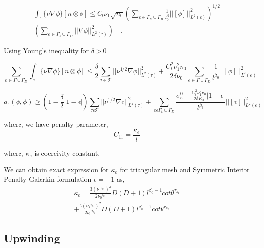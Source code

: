 \documentclass[a4paper,openany]{book}
\begin{document}
\begin{equation}
\begin{split}
\int_e \lbrace \nu \nabla \phi \rbrace[n \otimes \phi] \leq C_t \nu_1 \sqrt{n_0} \left( \sum_{e \in \Gamma_h \cup \Gamma_D} \frac{1}{l^\beta_0} ||[\phi]||^2_{L^2(e)} \right)^{1/2} \\ \left( \sum_{e \in \Gamma_h \cup \Gamma_D} ||\nabla \phi||^2_{L^2(\tau)} \right) \quad \textrm{.}
\end{split}
\end{equation}

Using Young's inequality for $\delta > 0$

\begin{equation}
\sum_{e \in \Gamma \cup \Gamma_D} \int_e \lbrace \nu \nabla \phi \rbrace [n \otimes \phi] \leq \frac{\delta}{2} \sum_{\tau \in \mathcal{T}} ||\nu^{1/2} \nabla \phi ||^2_{L^2(\tau)} +  \frac{C_t^2 \nu_1^2 n_0}{2 \delta \nu_0}  \sum_{e \in \Gamma \cup \Gamma_D} \frac{1}{l^{\beta_0}} ||[\phi]||^2_{L^2(e)}
\end{equation}


\begin{equation}
a_\epsilon (\phi , \phi) \geq \left( 1-\frac{\delta}{2} |1-\epsilon| \right) \sum_{\tau \epsilon \mathcal{T}} ||\nu^{1/2} \nabla v ||^2_{L^2(\tau)} + \sum_{e \epsilon \Gamma_h \cup \Gamma_D} \frac{\sigma_e^0 - \frac{C_t^2 \nu_1^2 n_0}{2 \delta K_0}|1-\epsilon|}{l^{\beta_0}} ||[v]||^2_{L^2(e)}
\end{equation}

where, we have penalty parameter,
\begin{equation}
C_{11} = \frac{\kappa_e}{l}
\end{equation} 

where, $\kappa_e$ is coercivity constant.

We can obtain exact expression for $\kappa_e$ for triangular mesh and Symmetric Interior Penalty Galerkin formulation $\epsilon = -1$ as,\\
\begin{equation}
\begin{split}
\kappa_e = \frac{3 ( {\nu_1}^{\tau_{k_1}})^2}{2 {\nu_0}^{\tau_{k_1}}} D (D+1) l^{\beta_0 - 1} cot {\theta^{\tau_{k_1}}}  \\ + \frac{3 ( {\nu_1}^{\tau_{k_2}})^2}{2 {\nu_0}^{\tau_{k_2}}} D (D+1) l^{\beta_0 - 1} cot {\theta^{\tau_{k_2}}}
\end{split}
\end{equation} 

\subsection{Upwinding} \label{upwinding}
\end{document}
